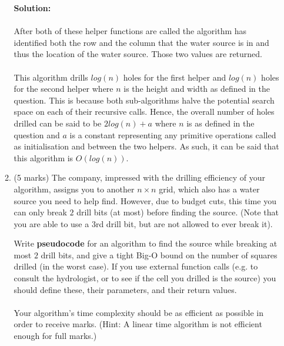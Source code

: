 \documentclass[a4,13pt]{extarticle}
\newenvironment{Solution}{\color{blue}\textbf{Solution:}}{}
\begin{document}
\begin{enumerate}
\begin{enumerate}
\begin{Solution}
				\\
				\\
				After both of these helper functions are called the algorithm has identified both the row and the column that the water source is in and thus the location of the water source. Those two values are returned.
				\\
				\\
				This algorithm drills $log(n)$ holes for the first helper and $log(n)$ holes for the second helper where $n$ is the height and width as defined in the question. This is because both sub-algorithms halve the potential search space on each of their recursive calls. Hence, the overall number of holes drilled can be said to be $2log(n) + a$ where $n$ is as defined in the question and $a$ is a constant representing any primitive operations called as initialisation and between the two helpers. As such, it can be said that this algorithm is $O(log(n))$.
	      	\end{Solution}
	      	      	      	              
	      	\item 
	      	      (5 marks) The company, impressed with the drilling efficiency of your algorithm, assigns you to another $n \times n$ grid, 
	      	      which also has a water source you need to help find. However, due to budget cuts, this time you can only break $2$ drill 
	      	      bits (at most) before finding the source. (Note that you are able to use a $3$rd drill bit, but are not allowed to ever break it).
	      	      	      	              
	      	      Write \textbf{pseudocode} for an algorithm to find the source while breaking at most $2$ drill bits, and give a tight Big-O 
	      	      bound on the number of squares drilled (in the worst case). If you use external function calls (e.g. to consult the hydrologist, 
	      	      or to see if the cell you drilled is the source) you should define these, their parameters, and their return values. \\\\
	      	      Your algorithm's time complexity should be as efficient as possible in order to receive marks. 
	      	      (Hint: A linear time algorithm is not efficient enough for full marks.)
	      	      

\end{enumerate}
\end{enumerate}
\end{document}
